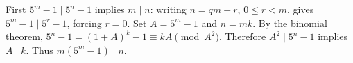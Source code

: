 First $5^m-1\mid5^n-1$ implies $m\mid n$: writing $n=qm+r$, $0\le r<m$, gives $5^m-1\mid5^r-1$, forcing $r=0$. Set $A=5^m-1$ and $n=mk$. By the binomial theorem, $5^n-1=(1+A)^k-1\equiv kA\pmod{A^2}$. Therefore $A^2\mid5^n-1$ implies $A\mid k$. Thus $\boxed{m(5^m-1)\mid n}$.
